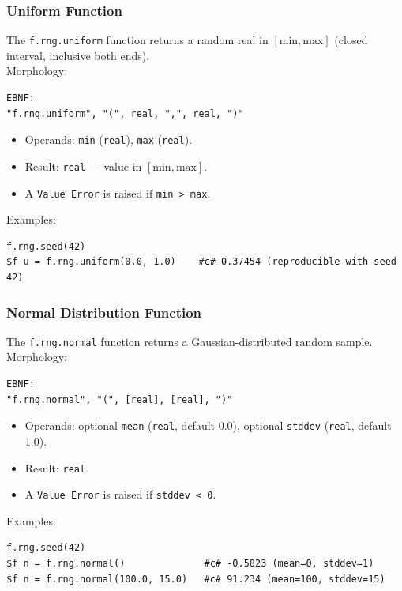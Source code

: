 \subsubsection{Uniform Function}
The \texttt{f.rng.uniform} function returns a random real in $[\text{min}, \text{max}]$ (closed interval, inclusive both ends). \\
Morphology:
\begin{verbatim}
EBNF:
"f.rng.uniform", "(", real, ",", real, ")"
\end{verbatim}
\begin{itemize}
\item Operands: \texttt{min} (\texttt{real}), \texttt{max} (\texttt{real}).
\item Result: \texttt{real} --- value in $[\text{min}, \text{max}]$.
\item A \texttt{Value Error} is raised if \texttt{min > max}.
\end{itemize}
Examples:
\begin{verbatim}
f.rng.seed(42)
$f u = f.rng.uniform(0.0, 1.0)    #c# 0.37454 (reproducible with seed 42)
\end{verbatim}

\subsubsection{Normal Distribution Function}
The \texttt{f.rng.normal} function returns a Gaussian-distributed random sample. \\
Morphology:
\begin{verbatim}
EBNF:
"f.rng.normal", "(", [real], [real], ")"
\end{verbatim}
\begin{itemize}
\item Operands: optional \texttt{mean} (\texttt{real}, default 0.0), optional \texttt{stddev} (\texttt{real}, default 1.0).
\item Result: \texttt{real}.
\item A \texttt{Value Error} is raised if \texttt{stddev < 0}.
\end{itemize}
Examples:
\begin{verbatim}
f.rng.seed(42)
$f n = f.rng.normal()              #c# -0.5823 (mean=0, stddev=1)
$f n = f.rng.normal(100.0, 15.0)   #c# 91.234 (mean=100, stddev=15)
\end{verbatim}

